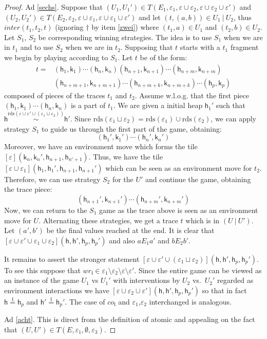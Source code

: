 \documentclass[nocopyrightspace,preprint]{sigplanconf}
\newcommand{\semparallel}{~|~}
\newcommand{\eff}{\varepsilon}
\newcommand{\reads}{\mathrm{rds}}
\newcommand{\rds}{\reads}
\newcommand{\cEff}[1]{\ensuremath{\mathit{co}_{#1}}}
\newcommand{\wEff}[1]{\ensuremath{\mathit{wr}_{#1}}}
\newcommand{\loc}{\mathfrak{l}}
\newcommand\heap{\ensuremath{\mathsf{h}}\xspace}
\newcommand\h{\heap}
\renewcommand\k{\ensuremath{\mathsf{k}}\xspace}
\newcommand\rloc[3]{\ensuremath{#1 \stackrel{#3}{\sim} #2}}
\newcommand\rrloc[3]{\ensuremath{#1 \stackrel{#3}{=} #2}}
\begin{document}
\begin{proof}
Ad \ref{sechs}. Suppose that $(U_1,U_1')\in
T(E_1,\eff_1,\eff\cup\eff_2,\eff\cup\eff_2\cup\eff')$ and $(U_2,U_2')\in T(E_2,\eff_2,\eff\cup\eff_1,\eff\cup\eff_1\cup\eff')$ and let $(t,(a,b))\in U_1\semparallel U_2$,
thus $\textit{inter}(t_1,t_2,t)$ (ignoring $\dagger$ by item
\ref{zwei}) where $(t_1,a)\in U_1$ and $(t_2,b)\in U_2$. Let $S_1$,
$S_2$ be corresponding winning strategies.  The idea is to use $S_1$
when we are in $t_1$ and to use $S_2$ when we are in $t_2$. Supposing
that $t$ starts with a $t_1$ fragment we begin by playing according to $S_1$. Let $t$ be of the form:
\[
\begin{array}{ll}
  t = & (\h_1,\k_1) \cdots (\h_n,\k_n) (\h_{n+1},\k_{n+1}) \cdots (\h_{n+m},\k_{n+m})\\ & (\h_{n+m+1},\k_{n+m+1}) \cdots (\h_{n+m+k},\k_{n+m+k})  \cdots (\h_p,\k_p)  
\end{array}
\]
composed of pieces of the traces $t_1$ and $t_2$. Assume w.l.o.g. that the first piece $(\h_1,\k_1) \cdots (\h_n,\k_n)$ is a part of $t_1$. We are given a initial heap $\h_1'$ such that $\rloc{\h}{\h'}{\rds(\eff\cup\eff'\cup(\eff_1\sqcup\eff_2))}$. Since $\rds(\eff_1\sqcup\eff_2)=\rds(\eff_1)\cup\rds(\eff_2)$, we can apply strategy $S_1$ to guide us through the first part of the game, obtaining:
\[
  (\h_1',\k_1') \cdots (\h_n',\k_n')
\]
Moreover, we have an environment move which forms the tile $[\eff](\k_n,\k_n',\h_{n+1},\h_{n'+1})$. Thus, we have the tile $[\eff \cup \eff_1](\h_1,\h_1',\h_{n+1},\h_{n+1}')$ which can be seen as an environment move for $t_2$. Therefore, we can use strategy $S_2$ for the $U'$ and continue the game, obtaining the trace piece:
\[
  (\h_{n+1}',\k_{n+1}') \cdots (\h_{n+m}',\k_{n+m}')
\]
Now, we can return to the $S_1$ game as the trace above is seen as an environment move for $U$. Alternating these strategies, we get a trace $t$ which is in $(U \semparallel U')$. Let $(a',b')$ be the final values reached at the end. It is clear that $[\eff\cup\eff'\cup\eff_1\cup\eff_2](\h,\h',\h_p,\h_p')$ and also $aE_1a'$ and $bE_2b'$. 

It remains to assert the stronger statement  $[\eff\cup\eff'\cup(\eff_1\sqcup\eff_2)](\h,\h',\h_p,\h_p')$. To see this suppose that $\wEff\loc\in\eff_1\setminus \eff_2\setminus\eff\setminus\eff'$. 
Since the entire game can be viewed as an instance of the game $U_1$ vs $U_1'$ with interventions by $U_2$ vs.\ $U_2'$ regarded as environment interactions we have $[\eff\cup\eff_2\cup\eff'](\h,\h',\h_p,\h_p')$ so that in fact 
$\rrloc{\h}{\h_p}{\loc}$ and $\rrloc{\h'}{\h_p'}{\loc}$. The case of $\cEff{\loc}$ and $\eff_1$,$\eff_2$ interchanged is analogous.


Ad \ref{acht}. This is direct from the definition of atomic and appealing on the fact that $(U,U') \in T(E, \eff_1,\emptyset, \eff_3)$.
\end{proof}
\end{document}
